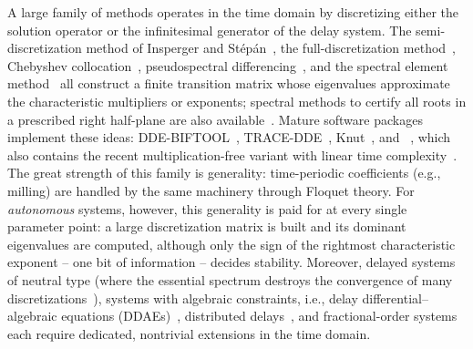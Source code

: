 A large family of methods operates in the time domain by discretizing either
the solution operator or the infinitesimal generator of the delay system.
The semi-discretization method of Insperger and
St\'ep\'an~\cite{insperger2002semi,insperger2004updated,insperger2008higher,insperger2011semidiscretization},
the full-discretization method~\cite{ding2010full}, Chebyshev
collocation~\cite{butcher2004stability}, pseudospectral
differencing~\cite{breda2005pseudospectral,breda2015stability}, and the
spectral element method~\cite{khasawneh2011spectral} all construct a finite
transition matrix whose eigenvalues approximate the characteristic
multipliers or exponents; spectral methods to certify all roots in a
prescribed right half-plane are also available~\cite{wu2012reliably}.
Mature software packages implement these ideas: DDE-BIFTOOL~\cite{engelborghs2002numerical,sieber2016ddebiftool},
TRACE-DDE~\cite{breda2009tracedde}, Knut~\cite{szalai2006continuation,szalai2013knut},
and ~\cite{bachrathy2026semidisc}, which also contains
the recent multiplication-free variant with linear time
complexity~\cite{bachrathy2026multiplication}. The great strength of this
family is generality: time-periodic coefficients (e.g., milling) are handled
by the same machinery through Floquet theory. For \emph{autonomous} systems,
however, this generality is paid for at every single parameter point: a large
discretization matrix is built and its dominant eigenvalues are computed,
although only the sign of the rightmost characteristic exponent -- one bit of
information -- decides stability. Moreover, delayed systems of neutral type
(where the essential spectrum destroys the convergence of many
discretizations~\cite{hale2002strong,michiels2005eigenvalue}), systems with
algebraic constraints, i.e., delay differential--algebraic equations
(DDAEs)~\cite{campbell1980singular,ha2016analysis}, distributed
delays~\cite{cushing1977integrodifferential}, and fractional-order
systems~\cite{petras2011fractional,fioravanti2012numerical,cermak2019delay}
each require dedicated, nontrivial extensions in the time domain.

